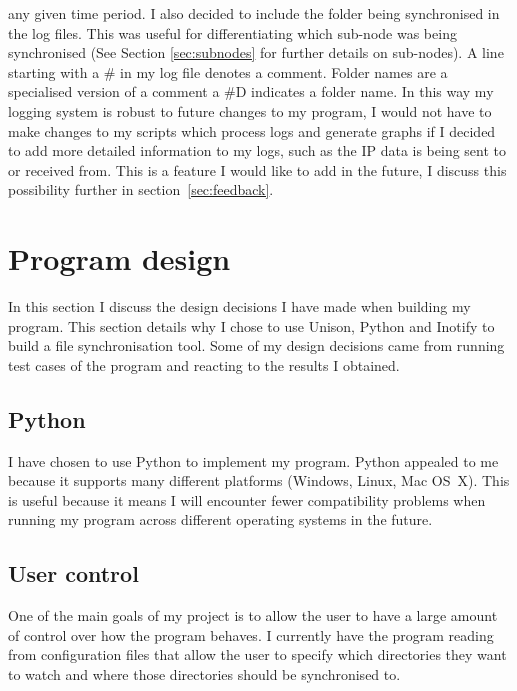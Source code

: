 \documentclass[12pt]{article}
\begin{document}
any given time period. I also decided to include
the folder being synchronised in the log files.
This was useful for differentiating which sub-node
was being synchronised (See Section \ref{sec:subnodes} for
further details on sub-nodes). A line starting with
a \# in my log file denotes a comment. Folder names
are a specialised version of a comment a \#D indicates
a folder name. In this way my logging system is robust
to future changes to my program, I would not have to
make changes to my scripts which process logs and generate graphs
if I decided to add more detailed information to my logs,
such as the IP data is being sent to or received from. This
is a feature I would like to add in the future, I discuss this
possibility further in section~\ref{sec:feedback}.

\newpage
\section{Program design}
In this section I discuss the design decisions I have
made when building my program. This section details
why I chose to use Unison, Python and Inotify to
build a file synchronisation tool. Some of my design
decisions came from running test cases of the program
and reacting to the results I obtained.

\subsection{Python}
I have chosen to use Python to implement
my program. Python appealed to me because it
supports many different platforms (Windows, Linux, Mac OS~X).
This is useful because it means I will
encounter fewer compatibility problems when running
my program across different operating systems in the future.


\subsection{User control}
One of the main goals of my project is to allow the user
to have a  large amount of control over how the program
behaves. I currently have the program reading from
configuration files that allow the user to specify
which directories they want to watch and where those
directories should be synchronised to.
\end{document}
